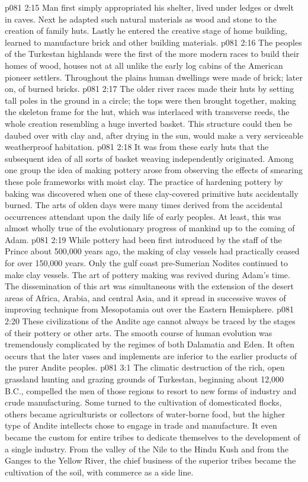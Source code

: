 \vs p081 2:15 \pc Man first simply appropriated his shelter, lived under ledges or dwelt in caves. Next he adapted such natural materials as wood and stone to the creation of family huts. Lastly he entered the creative stage of home building, learned to manufacture brick and other building materials.
\vs p081 2:16 The peoples of the Turkestan highlands were the first of the more modern races to build their homes of wood, houses not at all unlike the early log cabins of the American pioneer settlers. Throughout the plains human dwellings were made of brick; later on, of burned bricks.
\vs p081 2:17 The older river races made their huts by setting tall poles in the ground in a circle; the tops were then brought together, making the skeleton frame for the hut, which was interlaced with transverse reeds, the whole creation resembling a huge inverted basket. This structure could then be daubed over with clay and, after drying in the sun, would make a very serviceable weatherproof habitation.
\vs p081 2:18 It was from these early huts that the subsequent idea of all sorts of basket weaving independently originated. Among one group the idea of making pottery arose from observing the effects of smearing these pole frameworks with moist clay. The practice of hardening pottery by baking was discovered when one of these clay\hyp{}covered primitive huts accidentally burned. The arts of olden days were many times derived from the accidental occurrences attendant upon the daily life of early peoples. At least, this was almost wholly true of the evolutionary progress of mankind up to the coming of Adam.
\vs p081 2:19 While pottery had been first introduced by the staff of the Prince about 500,000 years ago, the making of clay vessels had practically ceased for over 150,000 years. Only the gulf coast pre\hyp{}Sumerian Nodites continued to make clay vessels. The art of pottery making was revived during Adam’s time. The dissemination of this art was simultaneous with the extension of the desert areas of Africa, Arabia, and central Asia, and it spread in successive waves of improving technique from Mesopotamia out over the Eastern Hemisphere.
\vs p081 2:20 These civilizations of the Andite age cannot always be traced by the stages of their pottery or other arts. The smooth course of human evolution was tremendously complicated by the regimes of both Dalamatia and Eden. It often occurs that the later vases and implements are inferior to the earlier products of the purer Andite peoples.
\vs p081 3:1 The climatic destruction of the rich, open grassland hunting and grazing grounds of Turkestan, beginning about 12,000\,B.C., compelled the men of those regions to resort to new forms of industry and crude manufacturing. Some turned to the cultivation of domesticated flocks, others became agriculturists or collectors of water\hyp{}borne food, but the higher type of Andite intellects chose to engage in trade and manufacture. It even became the custom for entire tribes to dedicate themselves to the development of a single industry. From the valley of the Nile to the Hindu Kush and from the Ganges to the Yellow River, the chief business of the superior tribes became the cultivation of the soil, with commerce as a side line.

